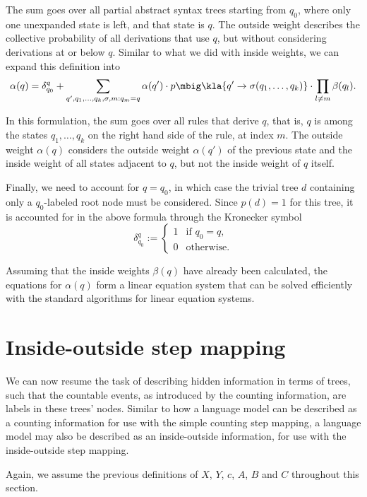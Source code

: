 The sum goes over all partial abstract syntax trees starting from $q_0$, where
only one unexpanded state is left, and that state is $q$. The outside weight
describes the collective probability of all derivations that use $q$, but
without considering derivations at or below $q$. Similar to what we did with
inside weights, we can expand this definition into
\begin{equation}\label{eq:02-alpha}
 \alpha(q) = \delta_{q_0}^q + \sum_{q',q_1,\ldots,q_k,\sigma,m:q_m=q} \alpha(q') \cdot p\mbig\kla{q'\to\sigma(q_1,\ldots,q_k)} \cdot \prod_{l\neq m} \beta(q_l).
\end{equation}

In this formulation, the sum goes over all rules that derive $q$, that is, $q$
is among the states $q_1,\ldots,q_k$ on the right hand side of the rule, at
index $m$. The outside weight $\alpha(q)$ considers the outside weight
$\alpha(q')$ of the previous state and the inside weight of all states adjacent
to $q$, but not the inside weight of $q$ itself.

Finally, we need to account for $q=q_0$, in which case the trivial tree $d$ containing only a $q_0$-labeled root node must be considered. Since $p(d)=1$ for this tree, it is accounted for in the above formula through the Kronecker symbol
\[
 \delta_{q_0}^q := \begin{cases}
  1 & \text{if } q_0 = q, \\
  0 & \text{otherwise}.
 \end{cases}
\]

Assuming that the inside weights $\beta(q)$ have already been calculated, the
equations for $\alpha(q)$ form a linear equation system that can be solved
efficiently with the standard algorithms for linear equation systems.

\section{Inside-outside step mapping}

We can now resume the task of describing hidden information in terms of trees,
such that the countable events, as introduced by the counting information, are
labels in these trees' nodes. Similar to how a language model can be described
as a counting information for use with the simple counting step mapping, a
language model may also be described as an inside-outside information, for use
with the inside-outside step mapping.

Again, we assume the previous definitions of $X$, $Y$, $c$, $A$, $B$ and $C$
throughout this section.


